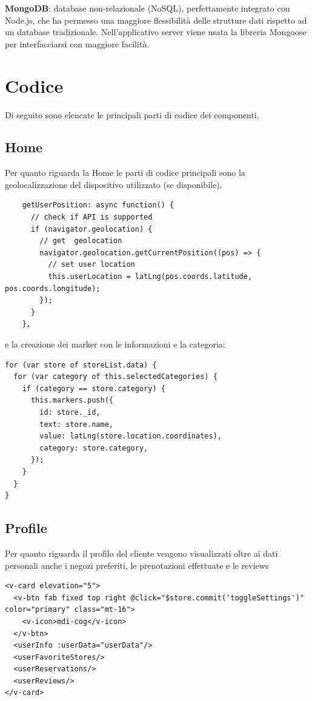 \documentclass[a4paper]{report}
\begin{document}
\textbf{MongoDB}: database non-relazionale (NoSQL), perfettamente integrato con Node.js, che ha permesso una maggiore flessibilità delle strutture dati rispetto ad un database tradizionale. Nell’applicativo server viene usata la libreria Mongoose per interfacciarsi con maggiore facilità.


\chapter{Codice}
Di seguito sono elencate le principali parti di codice dei componenti.
\section{Home}
Per quanto riguarda la Home le parti di codice principali sono la geolocalizzazione del dispositivo utilizzato (se disponibile).

\begin{lstlisting}
    getUserPosition: async function() {
      // check if API is supported
      if (navigator.geolocation) {
        // get  geolocation
        navigator.geolocation.getCurrentPosition((pos) => {
          // set user location
          this.userLocation = latLng(pos.coords.latitude,     pos.coords.longitude);
        });
      }
    },
\end{lstlisting}

e la creazione dei marker con le informazioni e la categoria:

\begin{lstlisting}
for (var store of storeList.data) {
  for (var category of this.selectedCategories) {
    if (category == store.category) {
      this.markers.push({
        id: store._id,
        text: store.name,
        value: latLng(store.location.coordinates),
        category: store.category,
      });
    }
  }
}
\end{lstlisting}
\pagebreak
\section{Profile}

Per quanto riguarda il profilo del cliente vengono visualizzati oltre ai dati personali anche i negozi preferiti, le prenotazioni effettuate e le reviews

\begin{lstlisting}
<v-card elevation="5">
  <v-btn fab fixed top right @click="$store.commit('toggleSettings')" color="primary" class="mt-16">
    <v-icon>mdi-cog</v-icon>
  </v-btn>
  <userInfo :userData="userData"/>
  <userFavoriteStores/>
  <userReservations/>
  <userReviews/>
</v-card>
\end{lstlisting}
\end{document}
